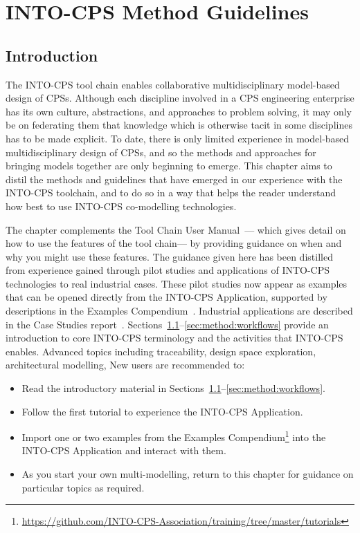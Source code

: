 \section{INTO-CPS Method Guidelines}
\label{sec:method}

\subsection{Introduction}
\label{sec:method:intro}

The INTO-CPS tool chain enables collaborative multidisciplinary model-based design of CPSs. Although each discipline involved in a CPS engineering enterprise has its own culture, abstractions, and approaches to problem solving, it may only be on federating them that knowledge which is otherwise tacit in some disciplines has to be made explicit. To date, there is only limited experience in model-based multidisciplinary design of CPSs, and so the methods and approaches for bringing models together are only beginning to emerge. This chapter aims to distil the methods and guidelines that have emerged in our experience with the INTO-CPS toolchain, and to do so in a way that helps the reader understand how best to use INTO-CPS co-modelling technologies.

The chapter complements the Tool Chain User Manual~\cite{INTOCPSD4.3a}--- which gives detail on how to use the features of the tool chain--- by providing guidance on when and why you might use these features. The guidance given here has been distilled from experience gained through pilot studies and applications of INTO-CPS technologies to real industrial cases. These pilot studies now appear as examples that can be opened directly from the INTO-CPS Application, supported by descriptions in the Examples Compendium~\cite{INTOCPSD3.6}. Industrial applications are described in the Case Studies report~\cite{INTOCPSD1.3a}. Sections~\ref{sec:method:intro}--\ref{sec:method:workflows} provide an introduction to core INTO-CPS terminology and the activities that INTO-CPS enables. Advanced topics including traceability, design space exploration, architectural modelling, New users are recommended to:

\begin{itemize}
  \item Read the introductory material in Sections~\ref{sec:method:intro}--\ref{sec:method:workflows}.
  \item Follow the first tutorial to experience the INTO-CPS Application.
  \item Import one or two examples from the Examples Compendium\footnote{\url{https://github.com/INTO-CPS-Association/training/tree/master/tutorials}} into the INTO-CPS Application and interact with them.
  \item As you start your own multi-modelling, return to this chapter for guidance on particular topics as required.
\end{itemize}

